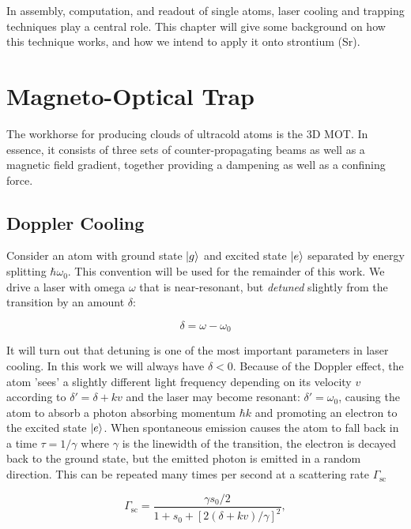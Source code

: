 In assembly, computation, and readout of single atoms, laser cooling and trapping techniques play a central role. This chapter will give some background on how this technique works, and how we intend to apply it onto strontium (Sr).

\section{Magneto-Optical Trap}

The workhorse for producing clouds of ultracold atoms is the 3D \ac{MOT}. In essence, it consists of three sets of counter-propagating beams as well as a magnetic field gradient, together providing a dampening as well as a confining force. 

\subsection{Doppler Cooling}

Consider an atom with ground state $\lvert g\rangle$ and excited state $\lvert e\rangle$ separated by energy splitting $\hbar \omega_0$. This convention will be used for the remainder of this work. We drive a laser with omega $\omega$ that is near-resonant, but \emph{detuned} slightly from the transition by an amount $\delta$:

\begin{equation}\label{detuning}
	\delta = \omega - \omega_0
\end{equation}

It will turn out that detuning is one of the most important parameters in laser cooling. In this work we will always have $\delta <0$. Because of the Doppler effect, the atom 'sees' a slightly different light frequency depending on its velocity $v$ according to $\delta'=\delta+kv$ and the laser may become resonant: $\delta' = \omega_0$, causing the atom to absorb a photon absorbing momentum $\hbar k$ and promoting an electron to the excited state $\lvert e\rangle$. When spontaneous emission causes the atom to fall back in a time $\tau = 1/\gamma$ where $\gamma$ is the linewidth of the transition, the electron is decayed back to the ground state, but the emitted photon is emitted in a random direction. This can be repeated many times per second at a scattering rate $\Gamma_{\text{sc}}$ \cite{Metcalf1999}

\begin{equation}\label{eq:ScatteringFrequency}
	\Gamma_{\text{sc}} = \frac{ \gamma s_0 /2}{1+s_0+\left[2(\delta+ k v)/\gamma\right]^2},
\end{equation}

